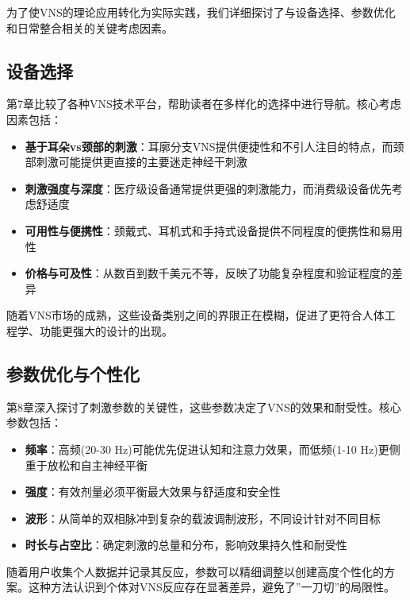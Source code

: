 \documentclass[
  Letterpaper,
]{scrbook}
\providecommand{\tightlist}{%
  \setlength{\itemsep}{0pt}\setlength{\parskip}{0pt}}\usepackage{longtable,booktabs,array}
\begin{document}
为了使VNS的理论应用转化为实际实践，我们详细探讨了与设备选择、参数优化和日常整合相关的关键考虑因素。

\subsection{设备选择}\label{ux8bbeux5907ux9009ux62e9}

第7章比较了各种VNS技术平台，帮助读者在多样化的选择中进行导航。核心考虑因素包括：

\begin{itemize}
\tightlist
\item
  \textbf{基于耳朵vs颈部的刺激}：耳廓分支VNS提供便捷性和不引人注目的特点，而颈部刺激可能提供更直接的主要迷走神经干刺激
\item
  \textbf{刺激强度与深度}：医疗级设备通常提供更强的刺激能力，而消费级设备优先考虑舒适度
\item
  \textbf{可用性与便携性}：颈戴式、耳机式和手持式设备提供不同程度的便携性和易用性
\item
  \textbf{价格与可及性}：从数百到数千美元不等，反映了功能复杂程度和验证程度的差异
\end{itemize}

随着VNS市场的成熟，这些设备类别之间的界限正在模糊，促进了更符合人体工程学、功能更强大的设计的出现。

\subsection{参数优化与个性化}\label{ux53c2ux6570ux4f18ux5316ux4e0eux4e2aux6027ux5316}

第8章深入探讨了刺激参数的关键性，这些参数决定了VNS的效果和耐受性。核心参数包括：

\begin{itemize}
\tightlist
\item
  \textbf{频率}：高频(20-30 Hz)可能优先促进认知和注意力效果，而低频(1-10
  Hz)更侧重于放松和自主神经平衡
\item
  \textbf{强度}：有效剂量必须平衡最大效果与舒适度和安全性
\item
  \textbf{波形}：从简单的双相脉冲到复杂的载波调制波形，不同设计针对不同目标
\item
  \textbf{时长与占空比}：确定刺激的总量和分布，影响效果持久性和耐受性
\end{itemize}

随着用户收集个人数据并记录其反应，参数可以精细调整以创建高度个性化的方案。这种方法认识到个体对VNS反应存在显著差异，避免了''一刀切''的局限性。
\end{document}

